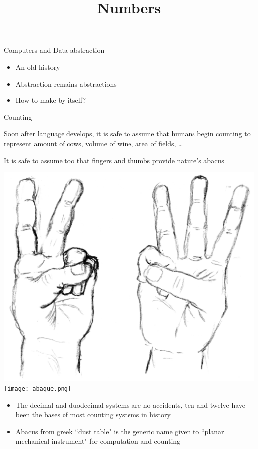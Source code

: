 \documentclass{beamer}
\title{Numbers}
\begin{document}
\frame{
  \titlepage
}

\begin{frame}{Computers and Data abstraction}
  \begin{block}{}
    \begin{itemize}
      \item An old history
      \item Abstraction remains abstractions
      \item How to make by itself?
    \end{itemize}
  \end{block}
\end{frame}

\begin{frame}{Counting}
  \begin{block}{}
    Soon after language develops, it is safe to assume that humans begin counting to represent amount of cows, volume of wine, area of fields, \dots
    
    It is safe to assume too that fingers and thumbs provide nature’s abacus
  \end{block}
  
  \hfill\includegraphics[width=0.25\linewidth]{compter.png}\hfill\texttt{[image: abaque.png]}\hfill~
  
  \begin{remark}
    \begin{itemize}
      \item The decimal and duodecimal systems are no accidents, ten and twelve have been the bases of most counting systems in history
      \item Abacus from greek ``dust table" is the generic name given to ``planar mechanical instrument" for computation and counting
    \end{itemize}
  \end{remark}
\end{frame}
\end{document}
